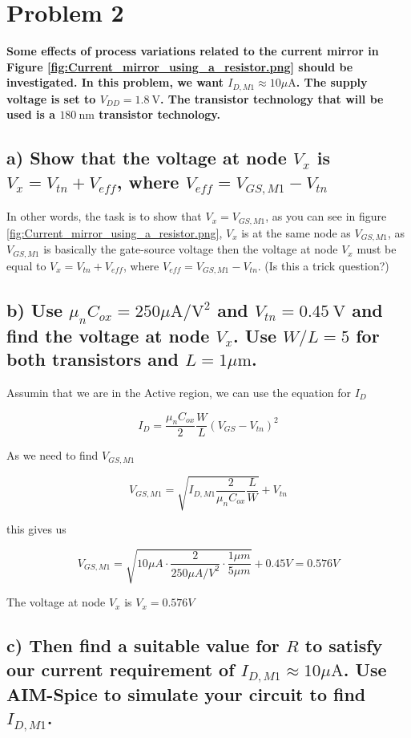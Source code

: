 \section{Problem 2}

\textbf{Some effects of process variations related to the current mirror in Figure \ref{fig:Current_mirror_using_a_resistor.png} should be investigated. In this problem, we want $I_{D, M 1} \approx 10 \mu \mathrm{A}$. The supply voltage is set to $V_{D D}=1.8 \mathrm{~V}$. The transistor technology that will be used is a $180 \mathrm{~nm}$ transistor technology.}


\subsection*{a) Show that the voltage at node $V_x$ is $V_x=V_{t n}+V_{e f f}$, where $V_{e f f}=V_{G S, M 1}-V_{t n}$}

In other words, the task is to show that $V_x=V_{G S, M 1}$, as you can see in figure \ref{fig:Current_mirror_using_a_resistor.png}, $V_x$ is at the same node as $V_{G S, M 1}$, as $V_{G S, M 1}$ is basically the gate-source voltage then the voltage at node $V_x$ must be equal to $V_x=V_{t n}+V_{e f f}$, where $V_{e f f}=V_{G S, M 1}-V_{t n}$. (Is this a trick question?)

\subsection*{b) Use $\mu_n C_{o x}=250 \mu \mathrm{A} / \mathrm{V}^2$ and $V_{t n}=0.45 \mathrm{~V}$ and find the voltage at node $V_x$. Use $W / L=5$ for both transistors and $L=1 \mu \mathrm{m}$.}
Assumin that we are in the Active region, we can use the equation for $I_D$

\[I_D=\frac{\mu_n C_{o x}}{2} \frac{W}{L}\left(V_{G S}-V_{t n}\right)^2\]

As we need to find $V_{G S, M 1}$

\[V_{G S, M1}=\sqrt{I_{D, M1}\frac{2}{\mu_n C_{o x}}\frac{L}{W}}+V_{t n}\]

this gives us

\[V_{GS, M1} = \sqrt{10 \mu A \cdot \frac{2}{250 \mu A/V^2} \cdot \frac{1 \mu m}{5\mu m}} + 0.45 V=0.576V\]

The voltage at node $V_x$ is $V_x=0.576V$

\subsection*{c) Then find a suitable value for $R$ to satisfy our current requirement of $I_{D, M 1} \approx 10 \mu \mathrm{A}$. Use AIM-Spice to simulate your circuit to find $I_{D, M 1}$.}

